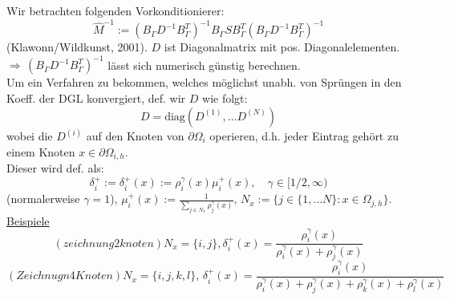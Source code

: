 Wir betrachten folgenden Vorkonditionierer:
\[\hat M^{-1} := (B_\Gamma D^{-1} B^T_\Gamma )^{-1} B_\Gamma S B^T_\Gamma (B_\Gamma D^{-1} B^T_\Gamma)^{-1} \]
(Klawonn/Wildkunst, 2001). $D$ ist Diagonalmatrix mit pos. Diagonalelementen.\\
$\Rightarrow \, (B_\Gamma D^{-1}B^T_\Gamma)^{-1} $ lässt sich numerisch günstig berechnen.\\
Um ein Verfahren zu bekommen, welches möglichst unabh. von Sprüngen in den Koeff. der DGL konvergiert, def. wir $D$ wie folgt:
\[ D= \text{diag}\left( D^{(1)},\dots D^{(N)} \right) \]
wobei die $D^{(i)}$ auf den Knoten von $\partial \Omega_i$ operieren, d.h. jeder Eintrag gehört zu einem Knoten $x \in \partial \Omega_{i,h}$.\\
Dieser wird def. als:
\[ \delta^+_i := \delta^+_i (x) := \rho^\gamma_i(x)\mu^+_i(x), \quad \gamma \in [1/2,\infty) \]
(normalerweise $\gamma=1$), $\mu^+_i(x) :=\frac{1} { \sum_{j \in N_x} \rho^\gamma_j (x)} ,\, N_x := \{ j \in \{ 1,\dots N\} : x \in \Omega_{j,h} \}$.\\
\underline{Beispiele}\\
\[ (zeichnung 2 knoten)  N_x=\{i,j\} , \delta^+_i(x)=\frac{\rho^\gamma_i(x) }{\rho^\gamma_i(x)  + \rho^\gamma_j(x) } \]
\[ (Zeichnugn 4 Knoten) N_x=\{i,j,k,l \}, \,  \delta^+_i(x)=\frac{\rho^\gamma_i(x) }{\rho^\gamma_i(x)  + \rho^\gamma_j(x) + \rho^\gamma_k(x)  + \rho^\gamma_l(x) } \]






